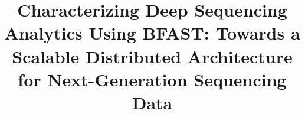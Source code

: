 \documentclass{acm_proc_article-sp}
\begin{document}

\newif\ifdraft
\drafttrue                                                                                                   

\ifdraft
 \newcommand{\rananote}[1]{ {\textcolor{blue}    { ***Omer:     #1 }}}
 \newcommand{\jkimnote}[1]{{\textcolor{green}   { ***Joohyun:   #1 }}}
 \newcommand{\jhanote}[1]{  {\textcolor{red}     { ***SJ: #1 }}}
  \newcommand{\smnote}[1]{  {\textcolor{blue}     { ***sharath: #1 }}}
 \newcommand{\todo}[1]{  {\textcolor{red}     { ***TODO: #1 }}}
 \newcommand{\fix}[1]{  {\textcolor{red}     { ***FIX: #1 }}}

\else
 \newcommand{\rananote}[1]{}
 \newcommand{\jkimnote}[1]{}
 \newcommand{\jhanote}[1]{}
 \newcommand{\todo}[1]{  {\textcolor{red}     { ***TODO: #1 }}}
 \newcommand{\fix}[1]{}                                                                                     
\fi

\title{Characterizing Deep Sequencing Analytics Using BFAST: Towards a
  Scalable Distributed Architecture for Next-Generation Sequencing
  Data}


%
%
%
%
%
\end{document}
